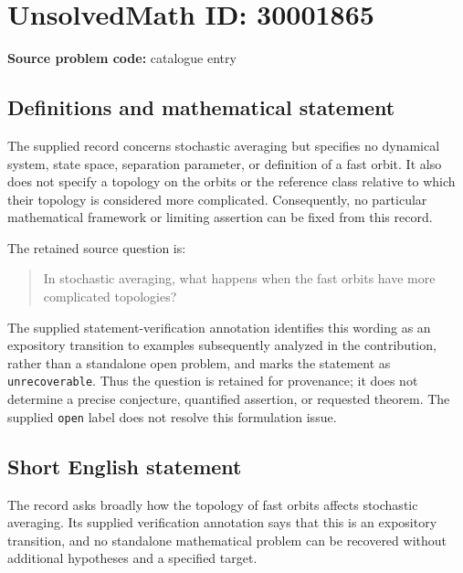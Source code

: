 \documentclass[11pt]{article}
\begin{document}
\section*{UnsolvedMath ID: 30001865}
\textbf{Source problem code:} catalogue entry
\subsection{Definitions and mathematical statement}
The supplied record concerns stochastic averaging but specifies no dynamical system, state space, separation parameter, or definition of a fast orbit. It also does not specify a topology on the orbits or the reference class relative to which their topology is considered more complicated. Consequently, no particular mathematical framework or limiting assertion can be fixed from this record.

The retained source question is:
\begin{quote}
In stochastic averaging, what happens when the fast orbits have more complicated topologies?
\end{quote}
The supplied statement-verification annotation identifies this wording as an expository transition to examples subsequently analyzed in the contribution, rather than a standalone open problem, and marks the statement as \texttt{unrecoverable}. Thus the question is retained for provenance; it does not determine a precise conjecture, quantified assertion, or requested theorem. The supplied \texttt{open} label does not resolve this formulation issue.
\subsection{Short English statement}
The record asks broadly how the topology of fast orbits affects stochastic averaging. Its supplied verification annotation says that this is an expository transition, and no standalone mathematical problem can be recovered without additional hypotheses and a specified target.
\end{document}

